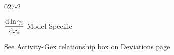 \begin{mitframe}{027-2}
\begin{listone}
\begin{listtwo}
\begin{listthree}
           		\item $\dfrac{\mathrm{d}\ln\actcoeff}{\mathrm{d}\conjcoor}$ Model Specific
            
            	\begin{listfour}

					\item See Activity-Gex relationship box on Deviations page

				\end{listfour}

			\end{listthree}

		\end{listtwo}
    
    \end{listone}    

\end{mitframe}